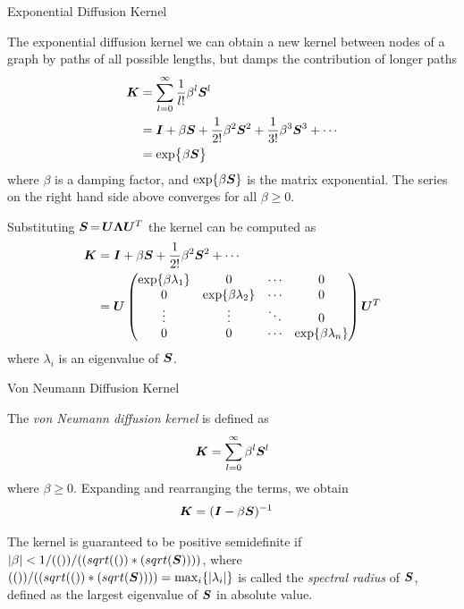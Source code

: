 \begin{frame}{Exponential Diffusion Kernel}
\small

The exponential diffusion kernel 
we can obtain a new kernel between nodes of a graph by 
paths of all possible lengths, but damps the contribution of longer
paths
\begin{align*}
  {\boldsymbol K} & = \sum_{l=0}^\infty {1 \over l!} \beta^l {\boldsymbol S}^l\\
  & = {\boldsymbol I} + \beta {\boldsymbol S} + {1 \over 2!} \beta^2 {\boldsymbol S}^2 + {1 \over 3!}
  \beta^3 {\boldsymbol S}^3 + \cdots\\
  & = \exp\bigl\{ \beta {\boldsymbol S} \bigr\}
\end{align*}
where $\beta$ is a damping factor, and $\exp\{\beta{\boldsymbol S}\}$ is the
matrix exponential. The series on the right hand side above converges
for all $\beta \ge 0$.

%
\medskip
Substituting ${\boldsymbol S} \,{=}\, {\boldsymbol U} {\bm \Lambda} {\boldsymbol U}^T$ the kernel can be computed
as
\begin{align*}
  {\boldsymbol K}
  & = {\boldsymbol I} + \beta {\boldsymbol S} + {1 \over 2!} \beta^2 {\boldsymbol S}^2 + \cdots\\
  & = {\boldsymbol U}
  \begin{pmatrix} 
  \exp\{\beta\lambda_1\} & 0 & \cdots & 0\\
  0 & \exp\{\beta\lambda_2\} & \cdots & 0\\
  \vdots & \vdots & \ddots & 0\\
  0 & 0 & \cdots & \exp\{\beta\lambda_n\}
   \end{pmatrix} {\boldsymbol U}^T
\end{align*}
where $\lambda_i$ is an eigenvalue of ${\boldsymbol S}$.
\end{frame}



\begin{frame}{Von Neumann Diffusion Kernel}

The {\em von Neumann diffusion kernel} is def\/{i}ned as
\begin{align*}
  {\boldsymbol K} = \sum_{l=0}^\infty \beta^l {\boldsymbol S}^l
\end{align*}
where $\beta \ge 0$.
Expanding and rearranging the terms, we obtain 
\begin{align*}
   {\boldsymbol K} &= ({\boldsymbol I} - \beta {\boldsymbol S})^{-1}
\end{align*}

\medskip
The kernel is guaranteed to be
positive semidef\/{i}nite if
$\lvert\beta\rvert < 1/(())/((sqrt(())*(sqrt({\boldsymbol S}))))$, where $(())/((sqrt(())*(sqrt({\boldsymbol S})))) = \max_i
\{\lvert\lambda_i\rvert\}$ is called the {\em spectral radius} of ${\boldsymbol S}$,
def\/{i}ned as the largest eigenvalue of ${\boldsymbol S}$ in
absolute value.
\end{frame}


